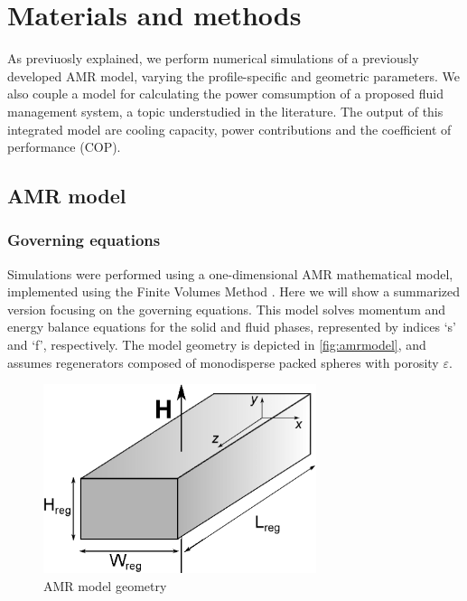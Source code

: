 \documentclass[referee]{svjour3}
\begin{document}
\section{Materials and methods}
\label{sec:materials-methods}

As previuosly explained, we perform numerical simulations of a previously developed AMR model, varying the profile-specific and geometric parameters. We also couple a model for calculating  the power comsumption of a proposed fluid management system, a topic understudied in the literature. The output of this integrated model are cooling capacity, power contributions and the coefficient of performance (COP).


\subsection{AMR model}
\label{sec:amr-model}

\subsubsection{Governing equations}
\label{sec:governing-equations}

Simulations were performed using a one-dimensional AMR mathematical model, implemented using the Finite Volumes Method \cite{bib:trevizoli16_perfor_model}. Here we will show a summarized version focusing on the governing equations. This model solves momentum and energy balance equations for the solid and fluid phases, represented by indices `s' and `f', respectively. The model geometry is depicted in \autoref{fig:amrmodel}, and assumes regenerators composed of monodisperse packed spheres with porosity $\varepsilon$.


\begin{figure}[!ht]
  \centering
  \includegraphics[width=8cm]{reg3d}
  \caption{AMR model geometry}
  \label{fig:amrmodel}
\end{figure}
\end{document}
